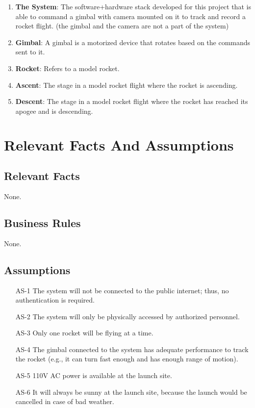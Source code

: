 \documentclass[12pt]{article}
\begin{document}
\begin{enumerate}
  \item \textbf{The System}: The software+hardware stack developed for this project that is able to command a gimbal with camera mounted on it to track and record a rocket flight. (the gimbal and the camera are not a part of the system)
  \item \textbf{Gimbal}: A gimbal is a motorized device that rotates based on the commands sent to it.
  \item \textbf{Rocket}: Refers to a model rocket.
  \item \textbf{Ascent}: The stage in a model rocket flight where the rocket is ascending.
  \item \textbf{Descent}: The stage in a model rocket flight where the rocket has reached its apogee and is descending.
\end{enumerate}

\section{Relevant Facts And Assumptions}
\subsection{Relevant Facts}

None.

\subsection{Business Rules}

None.

\subsection{Assumptions}

\begin{itemize}[leftmargin=*]
  \item[AS-1] The system will not be connected to the public internet; thus, no
        authentication is required.
  \item[AS-2] The system will only be physically accessed by authorized personnel.
  \item[AS-3] Only one rocket will be flying at a time.
  \item[AS-4] The gimbal connected to the system has adequate performance to track the
        rocket (e.g., it can turn fast enough and has enough range of motion).
  \item[AS-5] 110V AC power is available at the launch site.
  \item[AS-6] It will always be sunny at the launch site, because the launch would be
        cancelled in case of bad weather.
\end{itemize}
\end{document}

